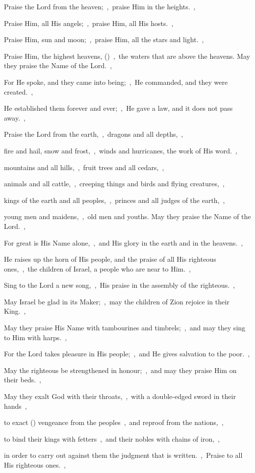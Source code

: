 \documentclass[12pt,twoside,a5paper]{article}
\begin{document}
\begin{halfparskip}
   Praise the Lord from the heaven;~\sep\ praise Him in the heights.~\sep

  Praise Him, all His angels;~\sep\ praise Him, all His hosts.~\sep

  Praise Him, sun and moon;~\sep\ praise Him, all the stars and light.~\sep

  Praise Him, the highest heavens, ()~\sep\ the waters that are above the heavens. May they praise the Name of the Lord.~\sep

  For He spoke, and they came into being;~\sep\ He commanded, and they were created.~\sep

  He established them forever and ever;~\sep\ He gave a law, and it does not pass away.~\sep

  Praise the Lord from the earth,~\sep\ dragons and all depths,~\sep

  fire and hail, snow and frost,~\sep\ winds and hurricanes, the work of His word.~\sep

  mountains and all hills,~\sep\ fruit trees and all cedars,~\sep

  animals and all cattle,~\sep\ creeping things and birds and flying creatures,~\sep

  kings of the earth and all peoples,~\sep\ princes and all judges of the earth,~\sep

  young men and maidens,~\sep\ old men and youths. May they praise the Name of the Lord.~\sep

  For great is His Name alone,~\sep\ and His glory in the earth and in the heavens.~\sep

  He raises up the horn of His people, and the praise of all His righteous ones,~\sep\ the children of Israel, a people who are near to Him.~\sep
\end{halfparskip}

\begin{halfparskip}
   Sing to the Lord a new song,~\sep\ His praise in the assembly of the righteous.~\sep

  May Israel be glad in its Maker;~\sep\ may the children of Zion rejoice in their King.~\sep

  May they praise His Name with tambourines and timbrels;~\sep\ and may they sing to Him with harps.~\sep

  For the Lord takes pleasure in His people;~\sep\ and He gives salvation to the poor.~\sep

  May the righteous be strengthened in honour;~\sep\ and may they praise Him on their beds.~\sep

  May they exalt God with their throats,~\sep\ with a double-edged sword in their hands~\sep

  to exact () vengeance from the peoples~\sep\ and reproof from the nations,~\sep

  to bind their kings with fetters~\sep\ and their nobles with chains of iron,~\sep

  in order to carry out against them the judgment that is written.~\sep\ Praise to all His righteous ones.~\sep
\end{halfparskip}
\end{document}
